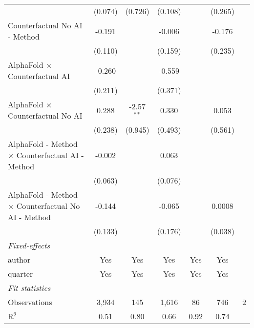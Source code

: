 \begin{tabular}{lcccccc}
                                                              & (0.074) & (0.726)       & (0.108) &         & (0.265) &   \\   
   Counterfactual No AI - Method                              & -0.191  &               & -0.006  &         & -0.176  &   \\   
                                                              & (0.110) &               & (0.159) &         & (0.235) &   \\   
   AlphaFold $\times$ Counterfactual AI                       & -0.260  &               & -0.559  &         &         &   \\   
                                                              & (0.211) &               & (0.371) &         &         &   \\   
   AlphaFold $\times$ Counterfactual No AI                    & 0.288   & -2.57$^{**}$  & 0.330   &         & 0.053   &   \\   
                                                              & (0.238) & (0.945)       & (0.493) &         & (0.561) &   \\   
   AlphaFold - Method $\times$ Counterfactual AI - Method     & -0.002  &               & 0.063   &         &         &   \\   
                                                              & (0.063) &               & (0.076) &         &         &   \\   
   AlphaFold - Method $\times$ Counterfactual No AI - Method  & -0.144  &               & -0.065  &         & 0.0008  &   \\   
                                                              & (0.133) &               & (0.176) &         & (0.038) &   \\   
   \midrule
   \emph{Fixed-effects}\\
   author                                                     & Yes     & Yes           & Yes     & Yes     & Yes     & \\  
   quarter                                                    & Yes     & Yes           & Yes     & Yes     & Yes     & \\  
   \midrule
   \emph{Fit statistics}\\
   Observations                                               & 3,934   & 145           & 1,616   & 86      & 746     & 2\\  
   R$^2$                                                      & 0.51    & 0.80          & 0.66    & 0.92    & 0.74    & \\  

\end{tabular}
